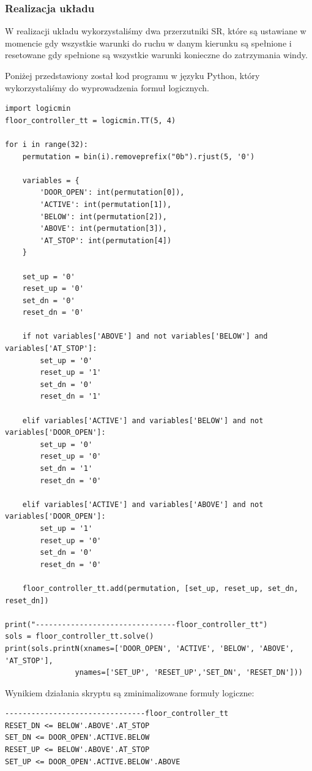 \documentclass[a4paper]{article}
\begin{document}
\subsubsection{Realizacja układu}
W realizacji układu wykorzystaliśmy dwa przerzutniki SR, które są ustawiane w momencie gdy wszystkie
warunki do ruchu w danym kierunku są spełnione i resetowane gdy spełnione są wszystkie warunki konieczne
do zatrzymania windy.

Poniżej przedstawiony został kod programu w języku Python, który wykorzystaliśmy do wyprowadzenia
formuł logicznych.
\begin{verbatim}
import logicmin
floor_controller_tt = logicmin.TT(5, 4)

for i in range(32):
    permutation = bin(i).removeprefix("0b").rjust(5, '0')
    
    variables = {
        'DOOR_OPEN': int(permutation[0]),
        'ACTIVE': int(permutation[1]),
        'BELOW': int(permutation[2]),
        'ABOVE': int(permutation[3]),
        'AT_STOP': int(permutation[4])
    }

    set_up = '0'
    reset_up = '0'
    set_dn = '0'
    reset_dn = '0'

    if not variables['ABOVE'] and not variables['BELOW'] and variables['AT_STOP']:
        set_up = '0'
        reset_up = '1'
        set_dn = '0'
        reset_dn = '1'

    elif variables['ACTIVE'] and variables['BELOW'] and not variables['DOOR_OPEN']:
        set_up = '0'
        reset_up = '0'
        set_dn = '1'
        reset_dn = '0'

    elif variables['ACTIVE'] and variables['ABOVE'] and not variables['DOOR_OPEN']:
        set_up = '1'
        reset_up = '0'
        set_dn = '0'
        reset_dn = '0'

    floor_controller_tt.add(permutation, [set_up, reset_up, set_dn, reset_dn])

print("--------------------------------floor_controller_tt")
sols = floor_controller_tt.solve()
print(sols.printN(xnames=['DOOR_OPEN', 'ACTIVE', 'BELOW', 'ABOVE', 'AT_STOP'],
                ynames=['SET_UP', 'RESET_UP','SET_DN', 'RESET_DN']))
\end{verbatim}

\pagebreak
Wynikiem działania skryptu są zminimalizowane formuły logiczne:

\begin{verbatim}
--------------------------------floor_controller_tt
RESET_DN <= BELOW'.ABOVE'.AT_STOP
SET_DN <= DOOR_OPEN'.ACTIVE.BELOW
RESET_UP <= BELOW'.ABOVE'.AT_STOP
SET_UP <= DOOR_OPEN'.ACTIVE.BELOW'.ABOVE
\end{verbatim}
\end{document}
